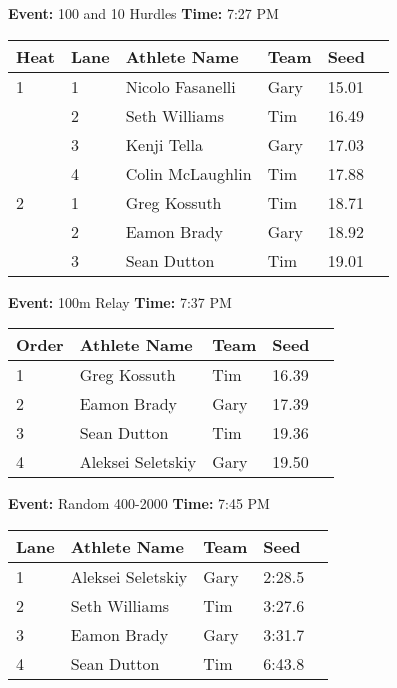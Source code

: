 \documentclass[10pt]{article}
\begin{document}
\textbf{Event:} 100 and 10 Hurdles \quad \textbf{Time:} 7:27 PM 

\vspace{1em}
\begin{tabular}{@{}llllll@{}}
\toprule
\textbf{{Heat}} &
\textbf{Lane} & \textbf{Athlete Name} & \textbf{Team} & \textbf{Seed} \\
\midrule
1 & 1 & Nicolo Fasanelli & Gary & 15.01 &\\
 & 2 & Seth Williams & Tim & 16.49 &\\
 & 3 & Kenji Tella & Gary & 17.03 &\\
 & 4 & Colin McLaughlin & Tim & 17.88 &\\
2 & 1 & Greg Kossuth & Tim & 18.71 &\\
 & 2 & Eamon Brady & Gary & 18.92 &\\
 & 3 & Sean Dutton & Tim & 19.01 &\\
\bottomrule
\end{tabular}
\vspace{2.5em}


\textbf{Event:} 100m Relay \quad \textbf{Time:} 7:37 PM 

\vspace{1em}
\begin{tabular}{@{}lllll@{}}
\toprule

\textbf{Order} & \textbf{Athlete Name} & \textbf{Team} & \textbf{Seed} \\
\midrule
1 & Greg Kossuth & Tim & 16.39 &\\
2 & Eamon Brady & Gary & 17.39 &\\
3 & Sean Dutton & Tim & 19.36 &\\
4 & Aleksei Seletskiy & Gary & 19.50 &\\
\bottomrule
\end{tabular}
\vspace{2.5em}


\textbf{Event:} Random 400-2000 \quad \textbf{Time:} 7:45 PM 

\vspace{1em}
\begin{tabular}{@{}lllll@{}}
\toprule

\textbf{Lane} & \textbf{Athlete Name} & \textbf{Team} & \textbf{Seed} \\
\midrule
1 & Aleksei Seletskiy & Gary & 2:28.5 &\\
2 & Seth Williams & Tim & 3:27.6 &\\
3 & Eamon Brady & Gary & 3:31.7 &\\
4 & Sean Dutton & Tim & 6:43.8 &\\
\bottomrule
\end{tabular}
\vspace{2.5em}
\end{document}
